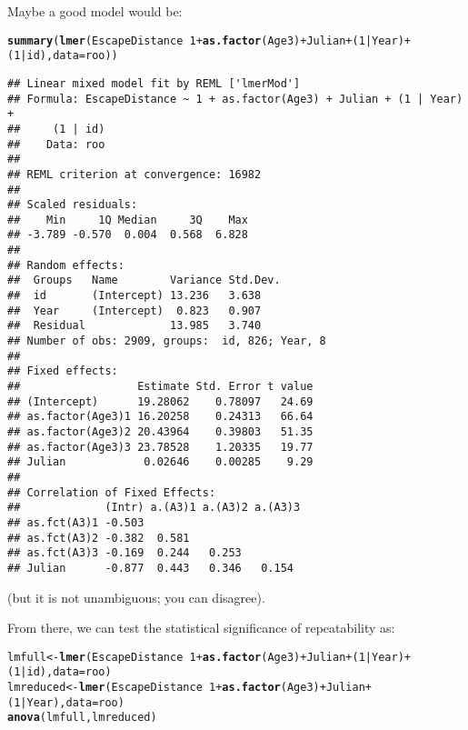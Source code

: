\documentclass[12pt,a4paper]{scrartcl}\usepackage[]{graphicx}\usepackage[]{color}
\makeatletter
\newcommand{\hlnum}[1]{\textcolor[rgb]{0.686,0.059,0.569}{#1}}%
\newcommand{\hlopt}[1]{\textcolor[rgb]{0,0,0}{#1}}%
\newcommand{\hlstd}[1]{\textcolor[rgb]{0.345,0.345,0.345}{#1}}%
\newcommand{\hlkwb}[1]{\textcolor[rgb]{0.69,0.353,0.396}{#1}}%
\newcommand{\hlkwc}[1]{\textcolor[rgb]{0.333,0.667,0.333}{#1}}%
\newcommand{\hlkwd}[1]{\textcolor[rgb]{0.737,0.353,0.396}{\textbf{#1}}}%
\newenvironment{kframe}{%
 \def\at@end@of@kframe{}%
 \ifinner\ifhmode%
  \def\at@end@of@kframe{\end{minipage}}%
  \begin{minipage}{\columnwidth}%
 \fi\fi%
 \def\FrameCommand##1{\hskip\@totalleftmargin \hskip-\fboxsep
 \colorbox{shadecolor}{##1}\hskip-\fboxsep
     \hskip-\linewidth \hskip-\@totalleftmargin \hskip\columnwidth}%
 \MakeFramed {\advance\hsize-\width
   \@totalleftmargin\z@ \linewidth\hsize
   \@setminipage}}%
 {\par\unskip\endMakeFramed%
 \at@end@of@kframe}
\newenvironment{knitrout}{}{} %
\makeatother
\begin{document}
\begin{Answer}
Maybe a good model would be:
\begin{knitrout}
\color{fgcolor}\begin{kframe}
\begin{alltt}
\hlkwd{summary}\hlstd{(}\hlkwd{lmer}\hlstd{(EscapeDistance} \hlopt{~} \hlnum{1} \hlopt{+} \hlkwd{as.factor}\hlstd{(Age3)} \hlopt{+} \hlstd{Julian} \hlopt{+} \hlstd{(}\hlnum{1}\hlopt{|}\hlstd{Year)} \hlopt{+} \hlstd{(}\hlnum{1}\hlopt{|}\hlstd{id) ,} \hlkwc{data}\hlstd{=roo))}
\end{alltt}
\begin{verbatim}
## Linear mixed model fit by REML ['lmerMod']
## Formula: EscapeDistance ~ 1 + as.factor(Age3) + Julian + (1 | Year) +  
##     (1 | id)
##    Data: roo
## 
## REML criterion at convergence: 16982
## 
## Scaled residuals: 
##    Min     1Q Median     3Q    Max 
## -3.789 -0.570  0.004  0.568  6.828 
## 
## Random effects:
##  Groups   Name        Variance Std.Dev.
##  id       (Intercept) 13.236   3.638   
##  Year     (Intercept)  0.823   0.907   
##  Residual             13.985   3.740   
## Number of obs: 2909, groups:  id, 826; Year, 8
## 
## Fixed effects:
##                  Estimate Std. Error t value
## (Intercept)      19.28062    0.78097   24.69
## as.factor(Age3)1 16.20258    0.24313   66.64
## as.factor(Age3)2 20.43964    0.39803   51.35
## as.factor(Age3)3 23.78528    1.20335   19.77
## Julian            0.02646    0.00285    9.29
## 
## Correlation of Fixed Effects:
##             (Intr) a.(A3)1 a.(A3)2 a.(A3)3
## as.fct(A3)1 -0.503                        
## as.fct(A3)2 -0.382  0.581                 
## as.fct(A3)3 -0.169  0.244   0.253         
## Julian      -0.877  0.443   0.346   0.154
\end{verbatim}
\end{kframe}
\end{knitrout}
(but it is not unambiguous; you can disagree).

From there, we can test the statistical significance of repeatability as:
\begin{knitrout}
\color{fgcolor}\begin{kframe}
\begin{alltt}
\hlstd{lmfull} \hlkwb{<-} \hlkwd{lmer}\hlstd{(EscapeDistance} \hlopt{~} \hlnum{1} \hlopt{+} \hlkwd{as.factor}\hlstd{(Age3)} \hlopt{+} \hlstd{Julian} \hlopt{+} \hlstd{(}\hlnum{1}\hlopt{|}\hlstd{Year)} \hlopt{+} \hlstd{(}\hlnum{1}\hlopt{|}\hlstd{id) ,} \hlkwc{data}\hlstd{=roo)}
\hlstd{lmreduced} \hlkwb{<-} \hlkwd{lmer}\hlstd{(EscapeDistance} \hlopt{~} \hlnum{1} \hlopt{+} \hlkwd{as.factor}\hlstd{(Age3)} \hlopt{+} \hlstd{Julian} \hlopt{+} \hlstd{(}\hlnum{1}\hlopt{|}\hlstd{Year) ,} \hlkwc{data}\hlstd{=roo)}
\hlkwd{anova}\hlstd{(lmfull, lmreduced)}
\end{alltt}



\end{kframe}
\end{knitrout}
\end{Answer}
\end{document}
